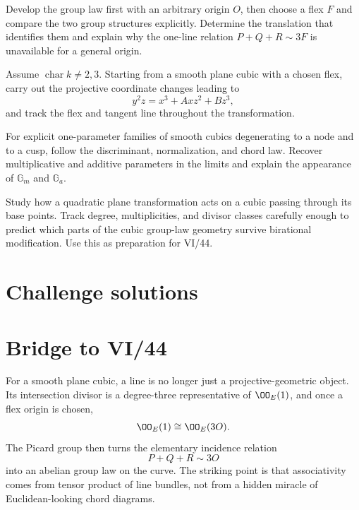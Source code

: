 \begin{problem}\label{chal:vi43-02}
Develop the group law first with an arbitrary origin \(O\), then choose a flex \(F\) and compare the two group structures explicitly.  Determine the translation that identifies them and explain why the one-line relation \(P+Q+R\sim3F\) is unavailable for a general origin.
\end{problem}

\begin{problem}\label{chal:vi43-03}
Assume \(\operatorname{char}k\neq2,3\).  Starting from a smooth plane cubic with a chosen flex, carry out the projective coordinate changes leading to
\[
  y^2z=x^3+Axz^2+Bz^3,
\]
and track the flex and tangent line throughout the transformation.
\end{problem}

\begin{problem}\label{chal:vi43-04}
For explicit one-parameter families of smooth cubics degenerating to a node and to a cusp, follow the discriminant, normalization, and chord law.  Recover multiplicative and additive parameters in the limits and explain the appearance of \(\mathbb G_m\) and \(\mathbb G_a\).
\end{problem}

\begin{problem}\label{chal:vi43-05}
Study how a quadratic plane transformation acts on a cubic passing through its base points.  Track degree, multiplicities, and divisor classes carefully enough to predict which parts of the cubic group-law geometry survive birational modification.  Use this as preparation for VI/44.
\end{problem}

\ifdefined\IncludeChallengeSolutions
\section{Challenge solutions}

\fi

\section*{Bridge to VI/44}

For a smooth plane cubic, a line is no longer just a projective-geometric object.  Its intersection divisor is a degree-three representative of \(\OO_E(1)\), and once a flex origin is chosen,
\[
  \OO_E(1)\cong\OO_E(3O).
\]
The Picard group then turns the elementary incidence relation
\[
  P+Q+R\sim3O
\]
into an abelian group law on the curve.  The striking point is that associativity comes from tensor product of line bundles, not from a hidden miracle of Euclidean-looking chord diagrams.

